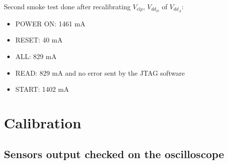 \documentclass[a4papper, 10pt]{article}
\begin{document}
     Second smoke test done after recalibrating $V_{clp}$, $V_{dd_D}$ of $V_{dd_A}$:
     
     \begin{itemize}
       \item POWER ON: 1461 mA
       \item RESET: 40 mA
       \item ALL: 829 mA
       \item READ: 829 mA and no error sent by the JTAG software
       \item START: 1402 mA
     \end{itemize}
 
  \section{Calibration}
    \subsection{Sensors output checked on the oscilloscope}
\end{document}
